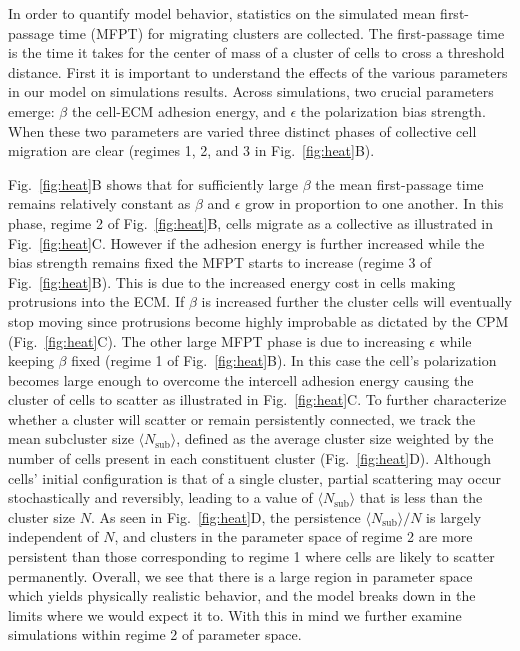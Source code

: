 In order to quantify model behavior, statistics on the simulated mean first-passage time (MFPT) for migrating clusters are collected. The first-passage time is the time it takes for the center of mass of a cluster of cells to cross a threshold distance. First it is important to understand the effects of the various parameters in our model on simulations results. Across simulations, two crucial parameters emerge: $\beta$ the cell-ECM adhesion energy, and $\epsilon$ the polarization bias strength. When these two parameters are varied three distinct phases of collective cell migration are clear (regimes 1, 2, and 3 in Fig.\ \ref{fig:heat}B).

Fig.\ \ref{fig:heat}B shows that for sufficiently large $\beta$ the mean first-passage time remains relatively constant as $\beta$ and $\epsilon$ grow in proportion to one another. In this phase, regime 2 of Fig.\ \ref{fig:heat}B, cells migrate as a collective as illustrated in Fig.\ \ref{fig:heat}C. However if the adhesion energy is further increased while the bias strength remains fixed the MFPT starts to increase (regime 3 of Fig.\ \ref{fig:heat}B). This is due to the increased energy cost in cells making protrusions into the ECM. If $\beta$ is increased further the cluster cells will eventually stop moving since protrusions become highly improbable as dictated by the CPM (Fig.\ \ref{fig:heat}C). The other large MFPT phase is due to increasing $\epsilon$
while keeping $\beta$ fixed (regime 1 of Fig.\ \ref{fig:heat}B).
In this case the cell's polarization becomes large enough to overcome the intercell adhesion energy causing the cluster of cells to scatter as illustrated in Fig.\ \ref{fig:heat}C. To further characterize whether a cluster will scatter or remain persistently connected, we track the mean subcluster size $\langle N_\text{sub} \rangle$, defined as the average cluster size weighted by the number of cells present in each constituent cluster (Fig.\ \ref{fig:heat}D). Although cells' initial configuration is that of a single cluster, partial scattering may occur stochastically and reversibly, leading to a value of $\langle N_\text{sub} \rangle$ that is less than the cluster size $N$. As seen in Fig.\ \ref{fig:heat}D, the persistence $\langle N_\text{sub} \rangle/N$ is largely independent of $N$, and clusters in the parameter space of regime 2 are more persistent than those corresponding to regime 1 where cells are likely to scatter permanently. Overall, we see that there is a large region in parameter space which yields physically realistic behavior, and the model breaks down in the limits where we would expect it to. With this in mind we further examine simulations within regime 2 of parameter space.


